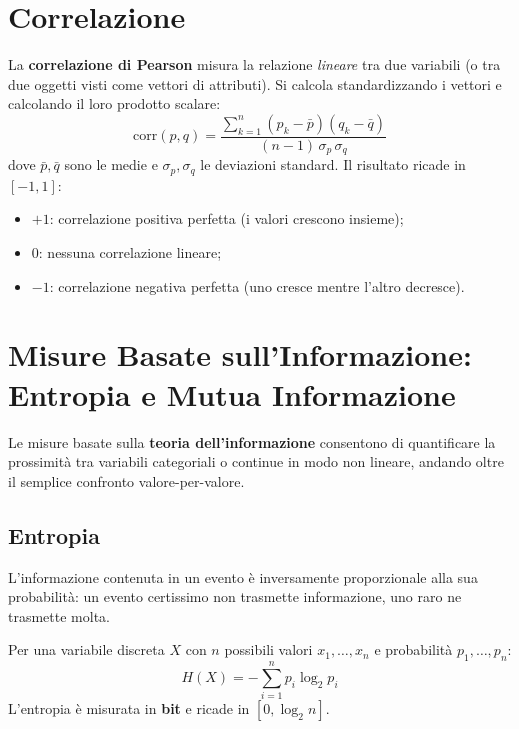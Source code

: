 \section{Correlazione}
\label{sec:correlation}

La \textbf{correlazione di Pearson} misura la relazione \textit{lineare} tra due variabili (o tra due oggetti visti come vettori di attributi). Si calcola standardizzando i vettori e calcolando il loro prodotto scalare:
\begin{equation}
  \mathrm{corr}(p, q) = \frac{\sum_{k=1}^{n}(p_k - \bar{p})(q_k - \bar{q})}{(n-1)\,\sigma_p\,\sigma_q}
  \label{eq:pearson}
\end{equation}
dove $\bar{p}, \bar{q}$ sono le medie e $\sigma_p, \sigma_q$ le deviazioni standard. Il risultato ricade in $[-1, 1]$:
\begin{itemize}
  \item $+1$: correlazione positiva perfetta (i valori crescono insieme);
  \item $0$: nessuna correlazione lineare;
  \item $-1$: correlazione negativa perfetta (uno cresce mentre l'altro decresce).
\end{itemize}

\section{Misure Basate sull'Informazione: Entropia e Mutua Informazione}
\label{sec:entropy}

Le misure basate sulla \textbf{teoria dell'informazione} consentono di quantificare la prossimità tra variabili categoriali o continue in modo non lineare, andando oltre il semplice confronto valore-per-valore.

\subsection{Entropia}

L'informazione contenuta in un evento è inversamente proporzionale alla sua probabilità: un evento certissimo non trasmette informazione, uno raro ne trasmette molta.

\begin{definition}
Per una variabile discreta $X$ con $n$ possibili valori $x_1, \ldots, x_n$ e probabilità $p_1, \ldots, p_n$:
\begin{equation}
  H(X) = -\sum_{i=1}^{n} p_i \log_2 p_i
  \label{eq:entropy}
\end{equation}
L'entropia è misurata in \textbf{bit} e ricade in $[0, \log_2 n]$.
\end{definition}


